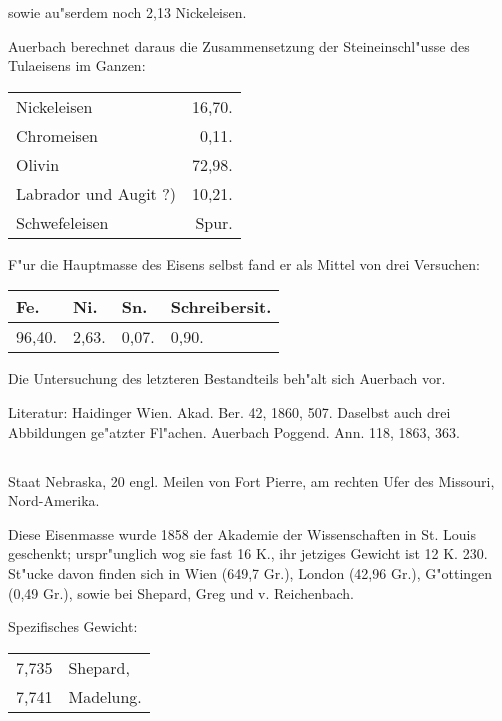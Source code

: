 \documentclass[a4paper, 11pt, oneside]{article}
\begin{document}
sowie au"serdem noch 2,13 Nickeleisen.

Auerbach berechnet daraus die Zusammensetzung der Steineinschl"usse des Tulaeisens im Ganzen:
\begin{table}[H]
    \centering\swabfamily\Large
    \begin{tabular}{l r}
        Nickeleisen & 16,70. \\
        Chromeisen & 0,11. \\
        Olivin & 72,98. \\
        Labrador und Augit ?)  & 10,21. \\
        Schwefeleisen & Spur. \\
    \end{tabular}
\end{table}

F"ur die Hauptmasse des Eisens selbst fand er als Mittel von drei Versuchen:
\begin{table}[H]
    \centering\swabfamily\Large
    \begin{tabular}{l l l l}
        Fe. & Ni. & Sn. & Schreibersit. \\ \hline
        96,40. & 2,63. & 0,07. & 0,90. \\
    \end{tabular}
\end{table}

Die Untersuchung des letzteren Bestandteils beh"alt sich Auerbach vor.

\normalsize
Literatur: Haidinger Wien. Akad. Ber. 42, 1860, 507. Daselbst auch drei Abbildungen ge"atzter Fl"achen. Auerbach Poggend. Ann. 118, 1863, 363.

\subsection{}
\LARGE
\paragraph{}
Staat Nebraska, 20 engl. Meilen von Fort Pierre, am rechten Ufer des Missouri, Nord-Amerika.

Diese Eisenmasse wurde 1858 der Akademie der Wissenschaften in St. Louis geschenkt; urspr"unglich wog sie fast 16 K., ihr jetziges Gewicht ist 12 K. 230. St"ucke davon finden sich in Wien (649,7 Gr.), London (42,96 Gr.), G"ottingen (0,49 Gr.), sowie bei Shepard, Greg und v. Reichenbach.

Spezifisches Gewicht:  
\begin{table}[!ht]
    \centering\swabfamily\Large
    \begin{tabular}{l l}
        7,735 & Shepard,\\
        7,741 & Madelung.
    \end{tabular}
\end{table}
\end{document}
